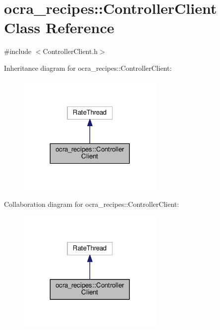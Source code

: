 \hypertarget{classocra__recipes_1_1ControllerClient}{}\section{ocra\+\_\+recipes\+:\+:Controller\+Client Class Reference}
\label{classocra__recipes_1_1ControllerClient}


{\ttfamily \#include $<$Controller\+Client.\+h$>$}



Inheritance diagram for ocra\+\_\+recipes\+:\+:Controller\+Client\+:
\nopagebreak
\begin{figure}[H]
\begin{center}
\leavevmode
\includegraphics[width=200pt]{db/d0d/classocra__recipes_1_1ControllerClient__inherit__graph}
\end{center}
\end{figure}


Collaboration diagram for ocra\+\_\+recipes\+:\+:Controller\+Client\+:
\nopagebreak
\begin{figure}[H]
\begin{center}
\leavevmode
\includegraphics[width=200pt]{db/d24/classocra__recipes_1_1ControllerClient__coll__graph}
\end{center}
\end{figure}
